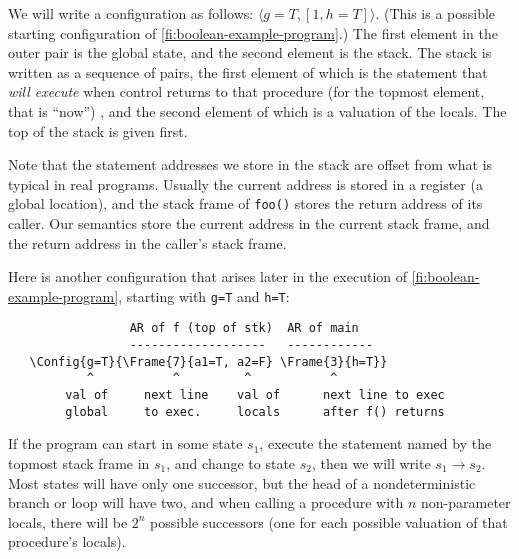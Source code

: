 \documentclass{article}
\newcommand{\Code}[1]{\texttt{#1}}
\newcommand{\Config}[2]{\ensuremath{\langle #1, #2 \rangle}}
\newcommand{\Frame}[2]{[#1, #2]}
\begin{document}
We will write a configuration as follows:
\Config{g=T}{\Frame{1}{h=T}}. (This is a possible starting
configuration of \cref{fi:boolean-example-program}.) The first element in
the outer pair is the global state, and the second element is the
stack. The stack is written as a sequence of pairs, the first element
of which is the statement that \emph{will execute} when control
returns to that procedure (for the topmost element, that is ``now'') ,
and the second element of which is a valuation of the locals. The top
of the stack is given first.

Note that the statement addresses we store in the stack are offset
from what is typical in real programs. Usually the current address is
stored in a register (a global location), and the stack frame of
\Code{foo()} stores the return address of its caller. Our semantics
store the current address in the current stack frame, and the return
address in the caller's stack frame\footnotemark.




Here is another configuration that arises later in the execution of
\cref{fi:boolean-example-program}, starting with \Code{g=T} and
\Code{h=T}:

\begin{minipage}{\textwidth}
\begin{verbatim}
                 AR of f (top of stk)  AR of main
                 -------------------   ------------
   \Config{g=T}{\Frame{7}{a1=T, a2=F} \Frame{3}{h=T}}
           ^           ^         ^           ^
        val of     next line    val of      next line to exec
        global     to exec.     locals      after f() returns
\end{verbatim}
\end{minipage}

If the program can start in some state $s_1$, execute the statement
named by the topmost stack frame in $s_1$, and change to state $s_2$,
then we will write $s_1 \rightarrow s_2$. Most states will have only
one successor, but the head of a nondeterministic branch or loop will
have two, and when calling a procedure with $n$ non-parameter locals,
there will be $2^n$ possible successors (one for each possible
valuation of that procedure's locals).
\end{document}
